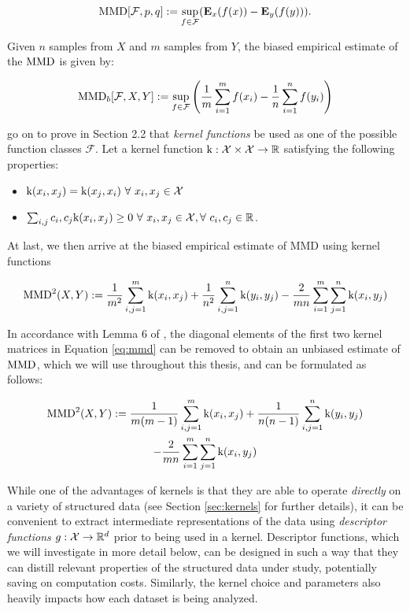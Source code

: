 \begin{equation}
  \label{eq:mmd_general}
  \text{MMD}[\mathcal{F},p,q]:=\sup_{f\in\mathcal{F}}(\mathbf{E}_x(f(x))-\mathbf{E}_y(f(y))).
\end{equation}

Given $n$ samples from $X$ and $m$ samples from $Y$, the biased empirical estimate
of the $\text{MMD}$ is given by:

\begin{equation}
  \label{eq:mmd_estimate}
  \text{MMD}_b[\mathcal{F},X,Y]:=\sup_{f\in\mathcal{F}}\left({1\over m}\sum_{i=1}^{m}f(x_i)-{1\over n}\sum_{i=1}^{n}f(y_i)\right)
\end{equation}

\cite{gretton2012kernel} go on to prove in Section 2.2 that \emph{kernel
functions} be used as one of the possible function classes $\mathcal{F}$. Let a
kernel function $\text{k}:\mathcal{X}\times \mathcal{X}\to\mathbb{R} $ satisfying the
following properties:

\begin{itemize}
\item $\tk(x_i,x_j)=\tk(x_j,x_i)\ \forall\ x_i,x_j\in\mathcal{X}$
\item $\sum_{i,j}c_i,c_j\tk(x_i,x_j)\geq 0\ \forall\ x_i,x_j\in\mathcal{X},
  \forall\ c_i,c_j\in\R$.
\end{itemize}

At last, we then arrive at the biased empirical estimate of MMD using kernel
functions

\begin{equation}
  \label{eq:mmd}
  \text{MMD}^2(X,Y) := {1\over m^2}\sum_{i,j=1}^m\text{k}(x_i, x_j) + {1\over n^2}\sum_{i,j=1}^n\text{k}(y_i,y_j) - {2\over mn}\sum_{i=1}^{m}\sum_{j=1}^{n}\text{k} (x_i,y_j)
\end{equation}

In accordance with Lemma 6 of \cite{gretton2012kernel}, the diagonal elements of
the first two kernel matrices in Equation \ref{eq:mmd} can be removed to
obtain an unbiased estimate of $\text{MMD}$, which we will use throughout this thesis,
and can be formulated as follows:

\begin{multline}
  \label{eq:mmd_unbiased}
  \text{MMD}^2(X,Y) := {1\over m(m-1)}\sum_{i,j=1}^m\text{k}(x_i, x_j) + {1\over n(n-1)}\sum_{i,j=1}^n\text{k}(y_i,y_j)\\ - {2\over mn}\sum_{i=1}^{m}\sum_{j=1}^{n}\text{k} (x_i,y_j)
\end{multline}

While one of the advantages of kernels is that they are able to operate
\emph{directly} on a variety of structured data (see Section \ref{sec:kernels}
for further details), it can be convenient to extract intermediate
representations of the data using \emph{descriptor functions}
$g:\mathcal{X}\to\mathbb{R}^d$ prior to being used in a kernel. Descriptor functions,
which we will investigate in more detail below, can be designed in such a way
that they can distill relevant properties of the structured data under study,
potentially saving on computation costs. Similarly, the kernel choice and
parameters also heavily impacts how each dataset is being analyzed. %

